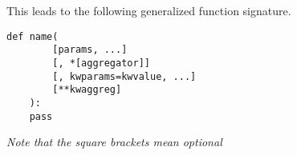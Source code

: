 \begin{frame}[fragile]

This leads to the following generalized function signature.

\begin{verbatim}
def name(
        [params, ...]
        [, *[aggregator]]
        [, kwparams=kwvalue, ...]
        [**kwaggreg]
    ):
    pass
\end{verbatim}

\emph{Note that the square brackets mean optional}

\end{frame}
